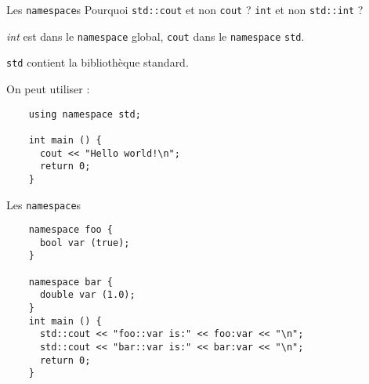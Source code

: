 \begin{frame}[fragile]{Les \texttt{namespace}s}
  Pourquoi \texttt{std::cout} et non \texttt{cout} ? \texttt{int} et non \texttt{std::int} ?
  
  \textit{int} est dans le \texttt{namespace} global, \texttt{cout} dans le \texttt{namespace} \texttt{std}.
  
  \texttt{std} contient la bibliothèque standard.

  On peut utiliser :
  \begin{lstlisting}
    using namespace std;
    
    int main () {
      cout << "Hello world!\n";
      return 0;
    }
  \end{lstlisting}
\end{frame}

\begin{frame}[fragile]{Les \texttt{namespace}s}
  \begin{lstlisting}
    namespace foo {
      bool var (true);
    }

    namespace bar {
      double var (1.0);
    }
    int main () {
      std::cout << "foo::var is:" << foo:var << "\n";
      std::cout << "bar::var is:" << bar:var << "\n";
      return 0;
    }
  \end{lstlisting}
\end{frame}
